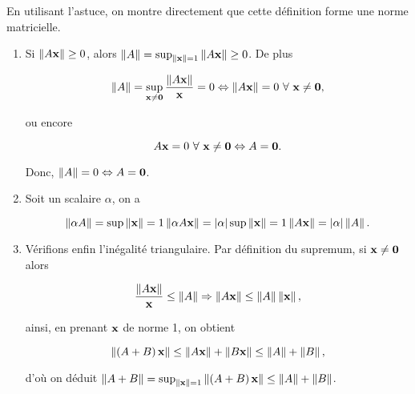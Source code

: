 En utilisant l'astuce, on montre directement que cette définition forme une norme matricielle.

\begin{enumerate}[label=\alph*)]
  \item Si $\left\lVert A \mathbf{x}\right\rVert \geq 0$, alors $\left\lVert A\right\rVert = \sup_{\left\lVert\mathbf{x}\right\rVert = 1} \left\lVert A \mathbf{x}\right\rVert \geq 0$. De plus
  
  \begin{equation*}
    \left\lVert A\right\rVert = \sup_{\mathbf{x} \neq \mathbf{0}} \dfrac{\left\lVert A \mathbf{x}\right\rVert}{\mathbf{x}} = 0
    \Leftrightarrow
    \left\lVert A \mathbf{x}\right\rVert = 0 \ \forall \ \mathbf{x} \neq \mathbf{0},
  \end{equation*}
  
  ou encore
  
  \begin{equation*}
    A \mathbf{x} = 0 \ \forall \ \mathbf{x} \neq \mathbf{0}
    \Leftrightarrow
    A = \mathbf{0}.
  \end{equation*}
  
  Donc, $\left\lVert A\right\rVert = 0 \Leftrightarrow A = \mathbf{0}$.
  
  \item Soit un scalaire $\alpha$, on a 
  
  \begin{equation*}
    \left\lVert\alpha A\right\rVert
    = \sup{\left\lVert\mathbf{x}\right\rVert = 1} \left\lVert\alpha A \mathbf{x}\right\rVert
    = \left\lvert\alpha\right\rvert \sup{\left\lVert\mathbf{x}\right\rVert = 1} \left\lVert A \mathbf{x}\right\rVert
    = \left\lvert\alpha\right\rvert \left\lVert A\right\rVert.
  \end{equation*}
  
  \item Vérifions enfin l'inégalité triangulaire. Par définition du supremum, si $\mathbf{x} \neq \mathbf{0}$ alors
  
  \begin{equation*}
    \dfrac{\left\lVert A \mathbf{x}\right\rVert}{\mathbf{x}} \leq \left\lVert A\right\rVert
    \Rightarrow \left\lVert A \mathbf{x}\right\rVert \leq \left\lVert A\right\rVert \left\lVert\mathbf{x}\right\rVert,
  \end{equation*}
  
  ainsi, en prenant $\mathbf{x}$ de norme 1, on obtient
  
  \begin{equation*}
    \left\lVert\left(A + B\right) \mathbf{x}\right\rVert
    \leq \left\lVert A \mathbf{x}\right\rVert + \left\lVert B \mathbf{x}\right\rVert
    \leq \left\lVert A\right\rVert + \left\lVert B\right\rVert, 
  \end{equation*}
  
  d'où on déduit $\left\lVert A + B\right\rVert = \sup_{\left\lVert\mathbf{x}\right\rVert = 1} \left\lVert\left(A + B\right) \mathbf{x}\right\rVert \leq \left\lVert A\right\rVert + \left\lVert B\right\rVert$.
  
  
  
\end{enumerate}



